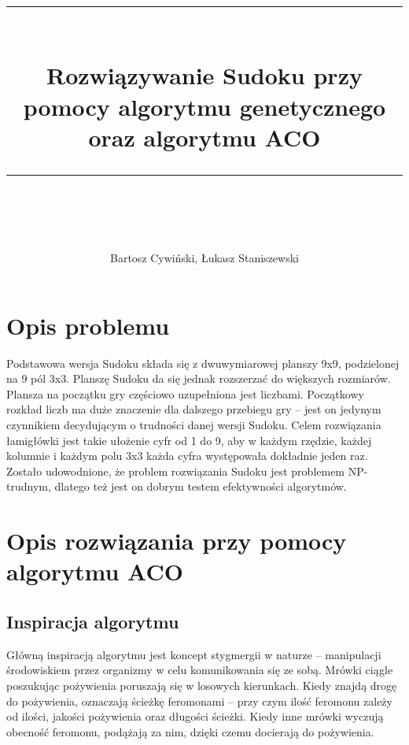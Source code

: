 \documentclass[11pt]{scrartcl} %
\title{	
	\normalfont\normalsize
	\rule{\linewidth}{0.5pt}\\ %
	\vspace{20pt} %
	{\huge Rozwiązywanie Sudoku przy pomocy algorytmu genetycznego oraz algorytmu ACO}\\ %
	\vspace{12pt} %
	\rule{\linewidth}{2pt}\\ %
}
\author{\LARGE Bartosz Cywiński, Łukasz Staniszewski} %
\date{} %
\begin{document}
\maketitle %

\section{Opis problemu}
Podstawowa wersja Sudoku składa się z dwuwymiarowej planszy 9x9, podzielonej na 9 pól 3x3. Planszę Sudoku da się jednak rozszerzać do większych rozmiarów. Plansza na początku gry częściowo uzupełniona jest liczbami. Początkowy rozkład liczb ma duże znaczenie dla dalszego przebiegu gry – jest on jedynym czynnikiem decydującym o trudności danej wersji Sudoku. Celem rozwiązania łamigłówki jest takie ułożenie cyfr od 1 do 9, aby w każdym rzędzie, każdej kolumnie i każdym polu 3x3 każda cyfra występowała dokładnie jeden raz. Zostało udowodnione, że problem rozwiązania Sudoku jest problemem NP-trudnym, dlatego też jest on dobrym testem efektywności algorytmów.

\section{Opis rozwiązania przy pomocy algorytmu ACO}


\subsection{Inspiracja algorytmu}

Główną inspiracją algorytmu jest koncept stygmergii w naturze – manipulacji środowiskiem przez organizmy w celu komunikowania się ze sobą. Mrówki ciągle poszukując pożywienia poruszają się w losowych kierunkach. Kiedy znajdą drogę do pożywienia, oznaczają ścieżkę feromonami – przy czym ilość feromonu zależy od ilości, jakości pożywienia oraz długości ścieżki. Kiedy inne mrówki wyczują obecność feromonu, podążają za nim, dzięki czemu docierają do pożywienia.
\end{document}
